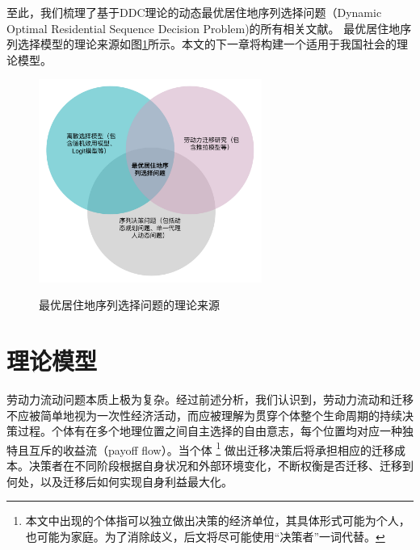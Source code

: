 \documentclass[a4paper, zihao=-4, fontset = mac, oneside]{ctexbook} %
\let\oldfootnote\footnote
\renewcommand{\footnote}[1]{%
  \oldfootnote{\setstretch{1.5}#1}%
}
\begin{document}
至此，我们梳理了基于DDC理论的动态最优居住地序列选择问题（Dynamic Optimal Residential Sequence Decision Problem)的所有相关文献。
最优居住地序列选择模型的理论来源如图\ref{fig:最优居住地序列选择问题的理论来源venn diagram}所示。本文的下一章将构建一个适用于我国社会的理论模型。
\begin{figure}[!ht]
\centering
\caption{最优居住地序列选择问题的理论来源}
\includegraphics[width=0.65\textwidth]{images/optimal_residential_sequence.drawio.pdf}
\label{fig:最优居住地序列选择问题的理论来源venn diagram}
\end{figure}
























\chapter{理论模型}

劳动力流动问题本质上极为复杂。经过前述分析，我们认识到，劳动力流动和迁移不应被简单地视为一次性经济活动，而应被理解为贯穿个体整个生命周期的持续决策过程。个体有在多个地理位置之间自主选择的自由意志，每个位置均对应一种独特且互斥的收益流（payoff flow）。当个体\footnote{本文中出现的个体指可以独立做出决策的经济单位，其具体形式可能为个人，也可能为家庭。为了消除歧义，后文将尽可能使用“决策者”一词代替。}做出迁移决策后将承担相应的迁移成本。决策者在不同阶段根据自身状况和外部环境变化，不断权衡是否迁移、迁移到何处，以及迁移后如何实现自身利益最大化。
\end{document}
